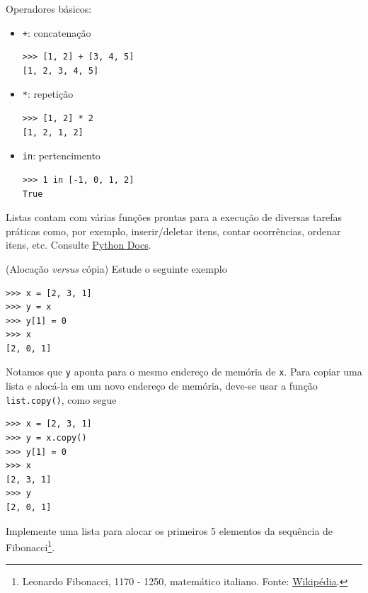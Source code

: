 \documentclass[12pt]{article}
\begin{document}
Operadores básicos:
\begin{itemize}
\item[] \lstinline-+-: concatenação

\begin{lstlisting}
>>> [1, 2] + [3, 4, 5]
[1, 2, 3, 4, 5]
\end{lstlisting}

  \item[] \lstinline+*+: repetição

\begin{lstlisting}
>>> [1, 2] * 2
[1, 2, 1, 2]
\end{lstlisting}

\item[] \lstinline+in+: pertencimento

\begin{lstlisting}
>>> 1 in [-1, 0, 1, 2]
True
\end{lstlisting}

\end{itemize}

\begin{obs}
  Listas contam com várias funções prontas para a execução de diversas tarefas práticas como, por exemplo, inserir/deletar itens, contar ocorrências, ordenar itens, etc. Consulte \href{https://docs.python.org/3/tutorial/datastructures.html#more-on-lists}{Python Docs}.
\end{obs}

\begin{obs}(Alocação {\it versus} cópia)
  Estude o seguinte exemplo

\begin{lstlisting}
>>> x = [2, 3, 1]
>>> y = x
>>> y[1] = 0
>>> x
[2, 0, 1]
\end{lstlisting}

  Notamos que \lstinline+y+ aponta para o mesmo endereço de memória de \lstinline+x+. Para copiar uma lista e alocá-la em um novo endereço de memória, deve-se usar a função \lstinline+list.copy()+, como segue

\begin{lstlisting}
>>> x = [2, 3, 1]
>>> y = x.copy()
>>> y[1] = 0
>>> x
[2, 3, 1]
>>> y
[2, 0, 1]
\end{lstlisting}

\end{obs}

\begin{exr}
  Implemente uma lista para alocar os primeiros 5 elementos da sequência de Fibonacci\footnote{Leonardo Fibonacci, 1170 - 1250, matemático italiano. Fonte: \href{https://pt.wikipedia.org/wiki/Leonardo\_Fibonacci}{Wikipédia}.}.
\end{exr}
\end{document}
